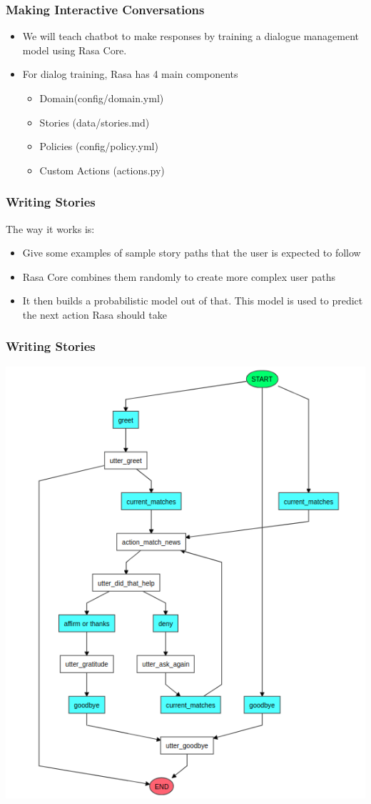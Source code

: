  \begin{frame}[fragile]\frametitle{Making Interactive Conversations}


\begin{itemize}
\item We will teach chatbot to make responses by training a dialogue management model using Rasa Core.
\item For dialog training, Rasa has 4 main components
\begin{itemize}
\item Domain(config/domain.yml)
\item Stories (data/stories.md)
\item Policies (config/policy.yml)
\item Custom Actions (actions.py)
\end{itemize}

\end{itemize}
\end{frame}

 \begin{frame}[fragile]\frametitle{Writing Stories}
The way it works is:

\begin{itemize}
\item Give some examples of sample story paths that the user is expected to follow
\item Rasa Core combines them randomly to create more complex user paths
\item It then builds a probabilistic model out of that. This model is used to predict the next action Rasa should take
\end{itemize}


\end{frame}

 \begin{frame}[fragile]\frametitle{Writing Stories}


\begin{center}
\includegraphics[width=0.55\linewidth,keepaspectratio]{images/conversation_flow.png}
\end{center}
\end{frame}

